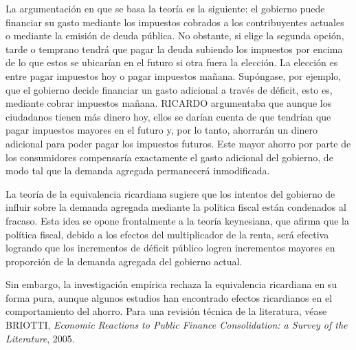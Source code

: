 \documentclass[10pt,a4paper]{article}
\begin{document}
La argumentación en que se basa la teoría es la siguiente: el gobierno puede financiar su gasto mediante los impuestos cobrados a los contribuyentes actuales o mediante la emisión de deuda pública. No obstante, si elige la segunda opción, tarde o temprano tendrá que pagar la deuda subiendo los impuestos por encima de lo que estos se ubicarían en el futuro si otra fuera la elección. La elección es entre pagar impuestos hoy o pagar impuestos mañana. Supóngase, por ejemplo, que el gobierno decide financiar un gasto adicional a través de déficit, esto es, mediante cobrar impuestos mañana. RICARDO argumentaba que aunque los ciudadanos tienen más dinero hoy, ellos se darían cuenta de que tendrían que pagar impuestos mayores en el futuro y, por lo tanto, ahorrarán un dinero adicional para poder pagar los impuestos futuros. Este mayor ahorro por parte de los consumidores compensaría exactamente el gasto adicional del gobierno, de modo tal que la demanda agregada permanecerá inmodificada.

La teoría de la equivalencia ricardiana sugiere que los intentos del gobierno de influir sobre la demanda agregada mediante la política fiscal están condenados al fracaso. Esta idea se opone frontalmente a la teoría keynesiana, que afirma que la política fiscal, debido a los efectos del multiplicador de la renta, será efectiva logrando que los incrementos de déficit público logren incrementos mayores en proporción de la demanda agregada del gobierno actual.

Sin embargo, la investigación empírica rechaza la equivalencia ricardiana en su forma pura, aunque algunos estudios han encontrado efectos ricardianos en el comportamiento del ahorro. Para una revisión técnica de la literatura, véase BRIOTTI, \textit{Economic Reactions to Public Finance Consolidation: a Survey of the Literature}, 2005.
\end{document}
